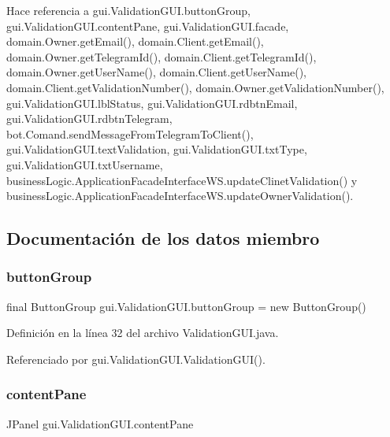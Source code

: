 Hace referencia a gui.\+Validation\+G\+U\+I.\+button\+Group, gui.\+Validation\+G\+U\+I.\+content\+Pane, gui.\+Validation\+G\+U\+I.\+facade, domain.\+Owner.\+get\+Email(), domain.\+Client.\+get\+Email(), domain.\+Owner.\+get\+Telegram\+Id(), domain.\+Client.\+get\+Telegram\+Id(), domain.\+Owner.\+get\+User\+Name(), domain.\+Client.\+get\+User\+Name(), domain.\+Client.\+get\+Validation\+Number(), domain.\+Owner.\+get\+Validation\+Number(), gui.\+Validation\+G\+U\+I.\+lbl\+Status, gui.\+Validation\+G\+U\+I.\+rdbtn\+Email, gui.\+Validation\+G\+U\+I.\+rdbtn\+Telegram, bot.\+Comand.\+send\+Message\+From\+Telegram\+To\+Client(), gui.\+Validation\+G\+U\+I.\+text\+Validation, gui.\+Validation\+G\+U\+I.\+txt\+Type, gui.\+Validation\+G\+U\+I.\+txt\+Username, business\+Logic.\+Application\+Facade\+Interface\+W\+S.\+update\+Clinet\+Validation() y business\+Logic.\+Application\+Facade\+Interface\+W\+S.\+update\+Owner\+Validation().



\subsection{Documentación de los datos miembro}
\mbox{\label{classgui_1_1_validation_g_u_i_a1908256eb6e291cba709b035ec08333a}} 
\subsubsection{\texorpdfstring{buttonGroup}{buttonGroup}}
{\footnotesize\ttfamily final Button\+Group gui.\+Validation\+G\+U\+I.\+button\+Group = new Button\+Group()\hspace{0.3cm}{\ttfamily [private]}}



Definición en la línea 32 del archivo Validation\+G\+U\+I.\+java.



Referenciado por gui.\+Validation\+G\+U\+I.\+Validation\+G\+U\+I().

\mbox{\label{classgui_1_1_validation_g_u_i_aef9acb4c0cb38c01fbf8ea562474335a}} 
\subsubsection{\texorpdfstring{contentPane}{contentPane}}
{\footnotesize\ttfamily J\+Panel gui.\+Validation\+G\+U\+I.\+content\+Pane\hspace{0.3cm}{\ttfamily [private]}}



